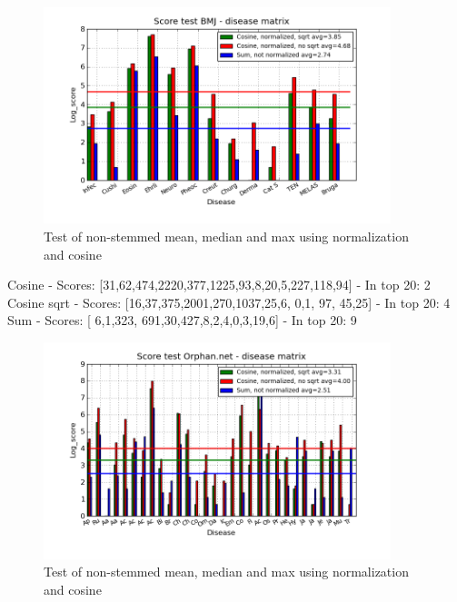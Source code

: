 \begin{figure}[h!]
        \begin{center}
          \includegraphics[width=0.9\textwidth]{barcharts/diseaseMatrix_bmj_hist_norm_3000_ns_cos_sqrt_cos_sum_nn.png}
        \end{center}
        \caption{Test of non-stemmed mean, median and max using normalization and cosine}
        \label{diseaseMatrix_bmj_hist_norm_3000_ns_cos_sqrt_cos_sum_nn}
\end{figure}
 
Cosine - Scores: [31,62,474,2220,377,1225,93,8,20,5,227,118,94] - In top 20: 2
Cosine sqrt - Scores: [16,37,375,2001,270,1037,25,6, 0,1, 97, 45,25] - In top 20: 4
Sum - Scores: [ 6,1,323, 691,30,427,8,2,4,0,3,19,6] - In top 20: 9

\begin{figure}[h!]
        \begin{center}
          \includegraphics[width=0.9\textwidth]{barcharts/diseaseMatrix_orphan_hist_NOTnorm_3000_ns_cos_sqrt_cos_sum_nn.png}
        \end{center}
        \caption{Test of non-stemmed mean, median and max using normalization and cosine}
        \label{diseaseMatrix_orphan_hist_NOTnorm_3000_ns_cos_sqrt_cos_sum_nn}
\end{figure}
 
